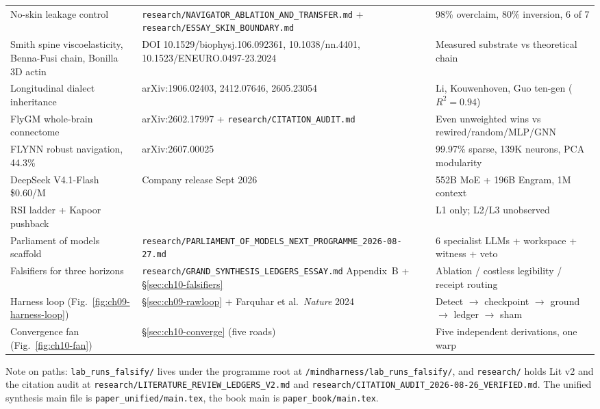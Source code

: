 \begin{center}
\begin{tabular}{p{3.6cm}p{5.2cm}p{4.4cm}}
No-skin leakage control & \texttt{research/NAVIGATOR\_ABLATION\_AND\_TRANSFER.md} + \texttt{research/ESSAY\_SKIN\_BOUNDARY.md} & 98\% overclaim, 80\% inversion, 6 of 7 \\
Smith spine viscoelasticity, Benna-Fusi chain, Bonilla 3D actin & DOI 10.1529/biophysj.106.092361, 10.1038/nn.4401, 10.1523/ENEURO.0497-23.2024 & Measured substrate vs theoretical chain \\
Longitudinal dialect inheritance & arXiv:1906.02403, 2412.07646, 2605.23054 & Li, Kouwenhoven, Guo ten-gen ($R^2=0.94$) \\
FlyGM whole-brain connectome & arXiv:2602.17997 + \texttt{research/CITATION\_AUDIT.md} \cite{flygm2026} & Even unweighted wins vs rewired/random/MLP/GNN \\
FLYNN robust navigation, 44.3\% & arXiv:2607.00025 \cite{flynn2026} & 99.97\% sparse, 139K neurons, PCA modularity \\
DeepSeek V4.1-Flash \$0.60/M & Company release Sept 2026 \cite{deepseek2026} & 552B MoE + 196B Engram, 1M context \\
RSI ladder + Kapoor pushback & \cite{kapoor2026,anthropic2026,weco2026,dreamrsi2026} & L1 only; L2/L3 unobserved \\
Parliament of models scaffold & \texttt{research/PARLIAMENT\_OF\_MODELS\_NEXT\_PROGRAMME\_2026-08-27.md} & 6 specialist LLMs + workspace + witness + veto \\
Falsifiers for three horizons & \texttt{research/GRAND\_SYNTHESIS\_LEDGERS\_ESSAY.md} Appendix~B + \S\ref{sec:ch10-falsifiers} & Ablation / costless legibility / receipt routing \\
Harness loop (Fig.~\ref{fig:ch09-harness-loop}) & \S\ref{sec:ch09-rawloop} + Farquhar et al.\ \textit{Nature} 2024 & Detect $\to$ checkpoint $\to$ ground $\to$ ledger $\to$ sham \\
Convergence fan (Fig.~\ref{fig:ch10-fan}) & \S\ref{sec:ch10-converge} (five roads) & Five independent derivations, one warp \\
\bottomrule
\end{tabular}
\end{center}

Note on paths: \texttt{lab\_runs\_falsify/} lives under the programme root at \texttt{/mindharness/lab\_runs\_falsify/}, and \texttt{research/} holds Lit v2 and the citation audit at \texttt{research/LITERATURE\_REVIEW\_LEDGERS\_V2.md} and \texttt{research/CITATION\_AUDIT\_2026-08-26\_VERIFIED.md}. The unified synthesis main file is \texttt{paper\_unified/main.tex}, the book main is \texttt{paper\_book/main.tex}.

